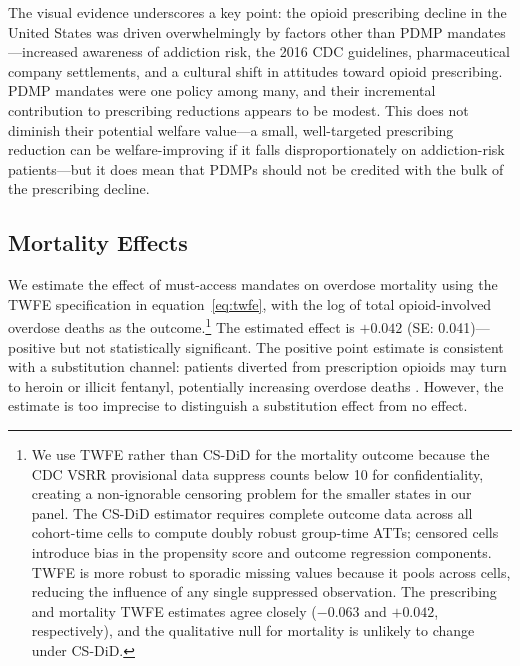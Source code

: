 \documentclass[12pt]{article}
\begin{document}
The visual evidence underscores a key point: the opioid prescribing decline in the United States was driven overwhelmingly by factors other than PDMP mandates---increased awareness of addiction risk, the 2016 CDC guidelines, pharmaceutical company settlements, and a cultural shift in attitudes toward opioid prescribing. PDMP mandates were one policy among many, and their incremental contribution to prescribing reductions appears to be modest. This does not diminish their potential welfare value---a small, well-targeted prescribing reduction can be welfare-improving if it falls disproportionately on addiction-risk patients---but it does mean that PDMPs should not be credited with the bulk of the prescribing decline.

\subsection{Mortality Effects}\label{sec:results_mortality}

We estimate the effect of must-access mandates on overdose mortality using the TWFE specification in equation~\eqref{eq:twfe}, with the log of total opioid-involved overdose deaths as the outcome.\footnote{We use TWFE rather than CS-DiD for the mortality outcome because the CDC VSRR provisional data suppress counts below 10 for confidentiality, creating a non-ignorable censoring problem for the smaller states in our panel. The CS-DiD estimator requires complete outcome data across all cohort-time cells to compute doubly robust group-time ATTs; censored cells introduce bias in the propensity score and outcome regression components. TWFE is more robust to sporadic missing values because it pools across cells, reducing the influence of any single suppressed observation. The prescribing and mortality TWFE estimates agree closely ($-0.063$ and $+0.042$, respectively), and the qualitative null for mortality is unlikely to change under CS-DiD.} The estimated effect is $+0.042$ (SE: 0.041)---positive but not statistically significant. The positive point estimate is consistent with a substitution channel: patients diverted from prescription opioids may turn to heroin or illicit fentanyl, potentially increasing overdose deaths \citep{doleac2019unintended, powell2020supply, alpert2022origins}. However, the estimate is too imprecise to distinguish a substitution effect from no effect.
\end{document}
